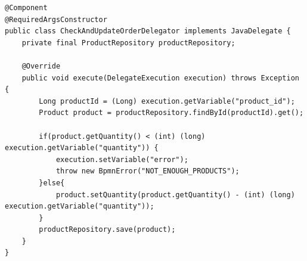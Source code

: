 \documentclass{article}
\begin{document}
\begin{lstlisting}
@Component
@RequiredArgsConstructor
public class CheckAndUpdateOrderDelegator implements JavaDelegate {
    private final ProductRepository productRepository;

    @Override
    public void execute(DelegateExecution execution) throws Exception {
        Long productId = (Long) execution.getVariable("product_id");
        Product product = productRepository.findById(productId).get();

        if(product.getQuantity() < (int) (long) execution.getVariable("quantity")) {
            execution.setVariable("error");
            throw new BpmnError("NOT_ENOUGH_PRODUCTS");
        }else{
            product.setQuantity(product.getQuantity() - (int) (long) execution.getVariable("quantity"));
        }
        productRepository.save(product);
    }
}
\end{lstlisting}
\end{document}
